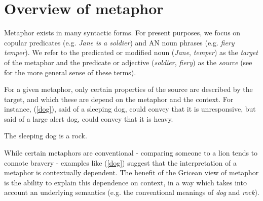 \documentclass[OpenMind]{stjour}
\begin{document}
\section{Overview of metaphor}

	Metaphor exists in many syntactic forms.
	For present purposes, we focus on copular predicates (e.g. \emph{Jane is a soldier}) and AN noun phrases (e.g. \emph{fiery temper}). We refer to the predicated or modified noun (\emph{Jane}, \emph{temper}) as the \emph{target} of the metaphor and the predicate or adjective (\emph{soldier}, \emph{fiery}) as the \emph{source} (see \citep{lakoff1980metaphors} for the more general sense of these terms).


	For a given metaphor, only certain properties of the source are described by the target, and which these are depend on the metaphor and the context. For instance, (\ref{dog}), said of a sleeping dog, could convey that it is unresponsive, but said of a large alert dog, could convey that it is heavy.

	\begin{exe}
	\ex The sleeping dog is a rock. \label{dog}
	\end{exe}

	While certain metaphors are conventional - comparing someone to a lion tends to connote bravery - examples like (\ref{dog}) suggest that the interpretation of a metaphor is contextually dependent. The benefit of the Gricean view of metaphor is the ability to explain this dependence on context, in a way which takes into account an underlying semantics (e.g. the conventional meanings of \emph{dog} and \emph{rock}).
	
\end{document}

